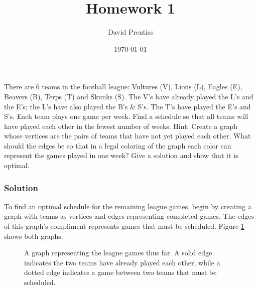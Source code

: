 \documentclass{amsart}
\author{David Prentiss}
\date{\today}
\title{Homework 1}
\begin{document}
\maketitle

\section{}
There are 6 teams in the football league: Vultures (V), Lions (L), Eagles (E),
Beavers (B), Terps (T) and Skunks (S).
The V's have already played the L's and the E's; the L's have also played the
B's \& S's.
The T's have played the E's and S's. Each team plays one game per week.
Find a schedule so that all teams will have played each other in the fewest
number of weeks.
Hint: Create a graph whose vertices are the pairs of teams that have not yet
played each other.
What should the edges be so that in a legal coloring of the graph each color can
represent the games played in one week?
Give a solution and show that it is optimal.

\subsubsection*{Solution}
To find an optimal schedule for the remaining league games, begin by creating a
graph with teams as vertices and edges representing completed games.
The edges of this graph's compliment represents games that must be scheduled.
Figure \ref{fig:teams} shows both graphs.
\begin{figure}[!h]
  \caption{A graph representing the league games thus far. A solid edge
    indicates the two teams have already played each other, while a dotted edge
    indicates a game between two teams that must be scheduled.}
  \label{fig:teams}
\end{figure}
\end{document}
